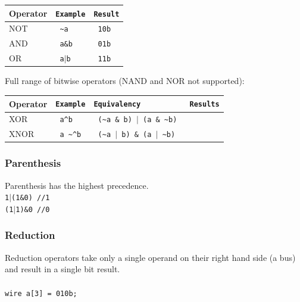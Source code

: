 \documentclass[letterpaper,11pt]{article}
\begin{document}
        \begin{center}
        \begin{tabular}{|l|>{\texttt\bgroup}l<{\egroup}|>{\texttt\bgroup}l<{\egroup}|}
        \hline
        Operator&Example&Result\\ \hline
        NOT		&	\textasciitilde a		&	10b\\ \hline
        AND		&	a\&b		&	01b\\ \hline
        OR		&	a$\mid$b	&	11b\\ \hline
        \end{tabular}
        \end{center} 
        Full range of bitwise operators (NAND and NOR not supported): \\
         
        \begin{center} 
        \begin{tabular}{|l|>{\texttt\bgroup}l<{\egroup}|>{\texttt\bgroup}l<{\egroup}|>{\texttt\bgroup}l<{\egroup}|}
        \hline
        Operator&Example&Equivalency&Results\\ \hline
        XOR		&	a\textasciicircum b	&	(\textasciitilde a \& b) $\mid$ (a \& \textasciitilde b)		&			\\ \hline
        XNOR	&	a \textasciitilde \textasciicircum b 	&	(\textasciitilde a $\mid$ b) \& (a $\mid$ \textasciitilde b) 	& 			\\ \hline
        \end{tabular}
        \end{center} 
        
        \subsubsection{Parenthesis}
        Parenthesis has the highest precedence. \\
        \texttt{1$\mid$(1\&0) \slash\slash1} \\
        \texttt{(1$\mid$1)\&0 \slash\slash 0} \\
        
        \subsubsection{Reduction}
        Reduction operators take only a single operand on their right hand side (a bus) and result in a
        single bit result. \\\\
        \texttt{wire a[3] = 010b;} \\
        
\end{document}
